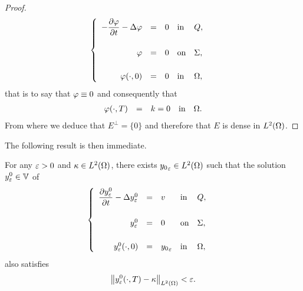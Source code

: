 \begin{proof}
\begin{equation*}
        \begin{cases}\displaystyle
            \begin{array}{rclll}
                -\dfrac{\partial{}\varphi}{\partial{}t} - \Delta\varphi & = & 0 & \text{in} &
                Q,\\
                \\
                \varphi & = & 0 & \text{on} & \Sigma,\\
                \\
                \varphi\!\left({\cdot,0}\right) & = & 0 & \text{in} &
                \Omega,
            \end{array}
        \end{cases}
    \end{equation*}
    that is to say that $\varphi\equiv 0$ and consequently that
    \begin{equation*}
        \begin{array}{rclll}
            \varphi\!\left({\cdot,T}\right) & = & k = 0 & \text{in} &
            \Omega.
        \end{array}
    \end{equation*}
    From where we deduce that $E^{\perp} = \{0\}$ and therefore that $E$ is
    dense in $L^{2}\!\left({\Omega}\right)$.
\end{proof}

The following result is then immediate.

\begin{corollaire}\label{coro:controllability-result-2}%
    For any $\varepsilon > 0$ and $\kappa\in L^{2}\!\left({\Omega}\right)$, there exists
    ${y_{0}}_{\varepsilon}\in L^{2}\!\left({\Omega}\right)$ such that the solution $\displaystyle
    y_{\varepsilon}^{0}\in \mathbb{V}$ of
    \begin{equation}\label{eq:controllability-result-3}
        \begin{cases}\displaystyle
            \begin{array}{rclll}
                \dfrac{\partial{}y_{\varepsilon}^{0}}{\partial{}t} - \Delta y_{\varepsilon}^{0} & = & v &
                \text{in} & Q,\\
                \\
                y_{\varepsilon}^{0} & = & 0 & \text{on} & \Sigma,\\
                \\
                y_{\varepsilon}^{0}\!\left({\cdot,0}\right) & = & {y_{0}}_{\varepsilon}
                & \text{in} & \Omega,
            \end{array}
        \end{cases}
    \end{equation}
    also satisfies
    \begin{equation*}\label{eq:controllability-result-4}
        {\left\|{y_{\varepsilon}^{0}\!\left({\cdot,T}\right) - \kappa }\right\|}_{L^{2}\left({\Omega}\right)} < \varepsilon.
    \end{equation*}
\end{corollaire}

